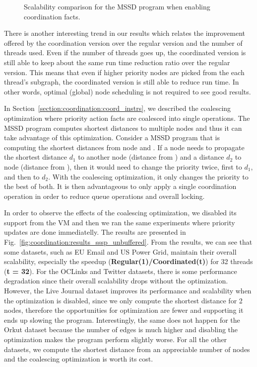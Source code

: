 \begin{figure}[]
        \caption{Scalability comparison for the MSSD program when enabling
        coordination facts.}

        \label{fig:coordination:results_sssp}
\end{figure}

There is another interesting trend in our results which relates the improvement
offered by the coordination version over the regular version and the number of
threads used. Even if the number of threads goes up, the coordinated version is
still able to keep about the same run time reduction ratio over the regular
version. This means that even if higher priority nodes are picked from the each
thread's subgraph, the coordinated version is still able to reduce run time. In
other words, optimal (global) node scheduling is not required to see good
results.

In Section~\ref{section:coordination:coord_instrs}, we described the coalescing
optimization where priority action facts are coalesced into single operations.
The MSSD program computes shortest distances to multiple nodes and thus it can
take advantage of this optimization. Consider a MSSD program that is computing
the shortest distances from node  and . If a node 
needs to propagate the shortest distance $d_1$ to another node 
(distance from ) and a distance $d_2$ to node  (distance from
), then it would need to change the priority twice, first to $d_1$, and
then to $d_2$.  With the coalescing optimization, it only changes the priority
to the best of both.  It is then advantageous to only apply a single
coordination operation in order to reduce queue operations and overall locking.

In order to observe the effects of the coalescing optimization, we disabled its
support from the VM and then we ran the same experiments where priority updates
are done immediatelly. The results are presented in
Fig.~\ref{fig:coordination:results_sssp_unbuffered}. From the results, we can
see that some datasets, such as EU Email and US Power Grid, maintain their
overall scalability, especially the speedup (\textbf{Regular(1)/Coordinated(t)})
for 32 threads (\textbf{t = 32}). For the OCLinks and Twitter datasets, there is
some performance degradation since their overall scalability drops without the
optimization. However, the Live Journal dataset improves its performance and
scalability when the optimization is disabled, since we only compute the
shortest distance for 2 nodes, therefore the opportunities for optimization are
fewer and supporting it ends up slowing the program. Interestingly, the same
does not happen for the Orkut dataset because the number of edges is much higher
and disabling the optimization makes the program perform slightly worse.  For
all the other datasets, we compute the shortest distance from an appreciable
number of nodes and the coalescing optimization is worth its cost.



